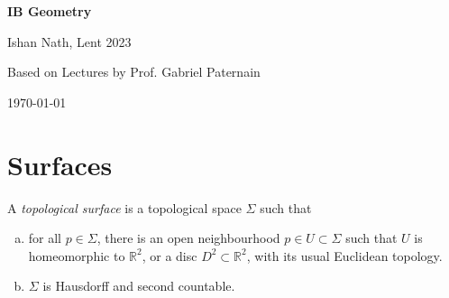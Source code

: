 \documentclass[12pt]{article}
\begin{document}

\hypersetup{pageanchor=false}
\begin{titlepage}
	\begin{center}
		\vspace*{1em}
		\Huge
		\textbf{IB Geometry}

		\vspace{1em}
		\large
		Ishan Nath, Lent 2023

		\vspace{1.5em}

		\Large

		Based on Lectures by Prof. Gabriel Paternain

		\vspace{1em}

		\large
		\today
	\end{center}
	
\end{titlepage}
\hypersetup{pageanchor=true}

\tableofcontents

\newpage

\section{Surfaces}
\label{sec:surfaces}

\begin{definition}
	A \emph{topological surface} is a topological space $\Sigma$ such that
	\begin{enumerate}[(a)]
		\item for all $p \in \Sigma$, there is an open neighbourhood $p \in U \subset \Sigma$ such that $U$ is homeomorphic to $\mathbb{R}^2$, or a disc $D^2 \subset \mathbb{R}^2$, with its usual Euclidean topology.
		\item $\Sigma$ is Hausdorff and second countable.
	\end{enumerate}
\end{definition}
\end{document}
